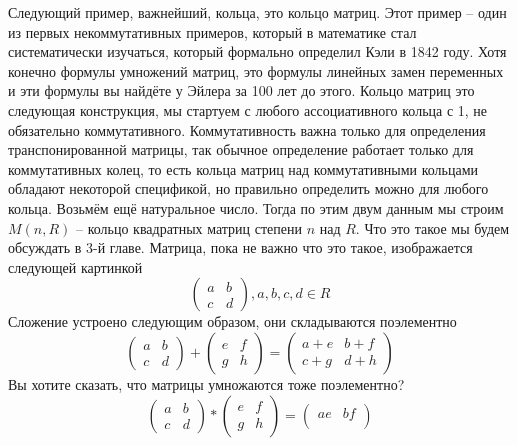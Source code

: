 \begin{itemize}
        Следующий пример, важнейший, кольца, это кольцо матриц. Этот пример –
        один из первых некоммутативных примеров, который в математике стал
        систематически изучаться, который формально определил Кэли в 1842 году.
        Хотя конечно формулы умножений матриц, это формулы линейных замен
        переменных и эти формулы вы найдёте у Эйлера за 100 лет до этого. Кольцо
        матриц это следующая конструкция, мы стартуем с любого ассоциативного
        кольца с 1, не обязательно коммутативного. Коммутативность важна только
        для определения транспонированной матрицы, так обычное определение
        работает только для коммутативных колец, то есть кольца матриц над 
        коммутативными кольцами обладают некоторой спецификой, но правильно
        определить можно для любого кольца. Возьмём ещё натуральное число.
        Тогда по этим двум данным мы строим $M(n,R)$ – кольцо квадратных матриц
        степени $n$ над $R$. Что это такое мы будем обсуждать в 3-й главе.
        Матрица, пока не важно что это такое, изображается следующей картинкой
        \[\begin{pmatrix}
            a & b\\
            c & d
        \end{pmatrix}, a,b,c,d\in R\]
        Сложение устроено следующим образом, они складываются поэлементно
        \[\begin{pmatrix}
            a & b\\
            c & d
        \end{pmatrix} +
        \begin{pmatrix}
            e & f\\
            g & h
        \end{pmatrix} =
        \begin{pmatrix}
            a+e & b+f\\
            c+g & d+h
        \end{pmatrix}\]
        Вы хотите сказать, что матрицы умножаются тоже поэлементно?
        \[\begin{pmatrix}
            a & b\\
            c & d
        \end{pmatrix} *
        \begin{pmatrix}
            e & f\\
            g & h
        \end{pmatrix} =
        \begin{pmatrix}
            ae & bf\\

\end{pmatrix}\]
\end{itemize}
